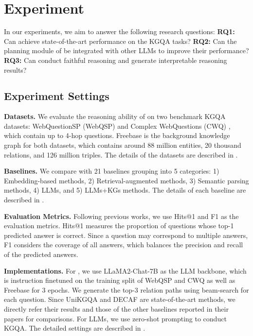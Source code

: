 \section{Experiment}
In our experiments, we aim to answer the following research questions:
\textbf{RQ1:} Can \ourmethod achieve state-of-the-art performance on the KGQA tasks?
\textbf{RQ2:} Can the planning module of \ourmethod be integrated with other LLMs to improve their performance?
\textbf{RQ3:} Can \ourmethod conduct faithful reasoning and generate interpretable reasoning results?


\subsection{Experiment Settings}
% 
\noindent\textbf{Datasets.} 
We evaluate the reasoning ability of \ourmethod on two benchmark KGQA datasets: WebQuestionSP (WebQSP) \citep{yih2016value} and Complex WebQuestions (CWQ) \citep{talmor2018web}, which contain up to 4-hop questions. Freebase \citep{bollacker2008freebase} is the background knowledge graph for both datasets, which contains around 88 million entities, 20 thousand relations, and 126 million triples. The details of the datasets are described in . 


\noindent\textbf{Baselines.} We compare \ourmethod with 21 baselines grouping into 5 categories: 1) Embedding-based methods, 2) Retrieval-augmented methods, 3) Semantic parsing methods, 4) LLMs, and 5) LLMs+KGs methods. The details of each baseline are described in .

\noindent\textbf{Evaluation Metrics.} Following previous works, we use Hits@1 and F1 as the evaluation metrics. Hits@1 measures the proportion of questions whose top-1 predicted answer is correct. Since a question may correspond to multiple answers, F1 considers the coverage of all answers, which balances the precision and recall of the predicted answers.

\noindent\textbf{Implementations.} For \ourmethod, we use LLaMA2-Chat-7B \citep{touvron2023llama} as the LLM backbone, which is instruction finetuned on the training split of WebQSP and CWQ as well as Freebase for 3 epochs. We generate the top-3 relation paths using beam-search for each question. Since UniKGQA \citep{jiang2022unikgqa} and DECAF \citep{yu2022decaf} are state-of-the-art methods, we directly refer their results and those of the other baselines reported in their papers for comparisons. For LLMs, we use zero-shot prompting to conduct KGQA. The detailed settings are described in .

